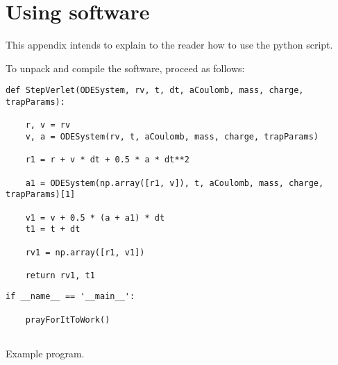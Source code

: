 \chapter{Using software}

This appendix intends to explain to the reader how to use the python script. 

To unpack and compile the software, proceed as follows:
\begin{Verbatim}
def StepVerlet(ODESystem, rv, t, dt, aCoulomb, mass, charge, trapParams):

    r, v = rv
    v, a = ODESystem(rv, t, aCoulomb, mass, charge, trapParams)
    
    r1 = r + v * dt + 0.5 * a * dt**2
    
    a1 = ODESystem(np.array([r1, v]), t, aCoulomb, mass, charge, trapParams)[1]    
    
    v1 = v + 0.5 * (a + a1) * dt
    t1 = t + dt
    
    rv1 = np.array([r1, v1])
    
    return rv1, t1   
\end{Verbatim}


\begin{listing}
\begin{lstlisting}
if __name__ == '__main__':
    
    prayForItToWork()
	    
\end{lstlisting}
\caption{Example program.}
\label{lst:ex}
\end{listing}
